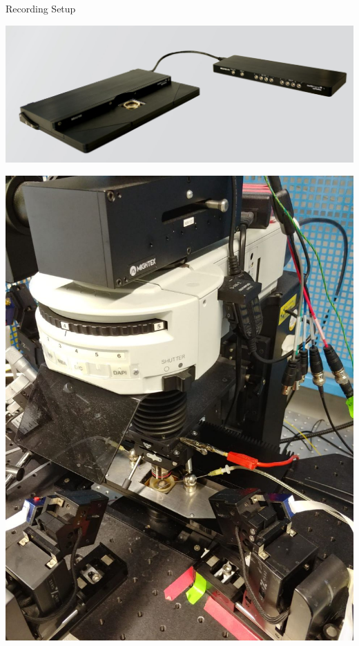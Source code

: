 \documentclass[10pt]{beamer}
\begin{document}
\begin{frame}[allowframebreaks]{Recording Setup}
  \begin{center}
  \includegraphics[keepaspectratio,width=0.95\framewidth]{img/1_setup_mea.png}
 \end{center}
 \framebreak
 \begin{center}
  \includegraphics[keepaspectratio,width=0.47\framewidth]{img/1_setup_top.jpg}
   \end{center}

\end{frame}
\end{document}
